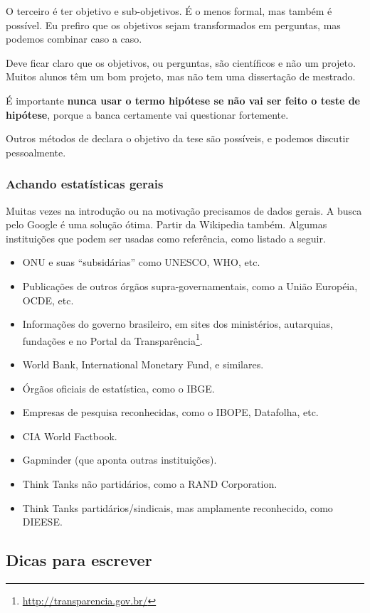 \documentclass{article}
\begin{document}
O terceiro é ter objetivo e sub-objetivos. É o menos formal, mas também é possível. Eu prefiro que os objetivos sejam transformados em perguntas, mas podemos combinar caso a caso.

Deve ficar claro que os objetivos, ou perguntas, são científicos e não um projeto. Muitos alunos têm um bom projeto, mas não tem uma dissertação de mestrado.

É importante \textbf{nunca usar o termo hipótese se não vai ser feito o teste de hipótese}, porque a banca certamente vai questionar fortemente.

Outros métodos de declara o objetivo da tese são possíveis, e podemos discutir pessoalmente.

\subsubsection{Achando estatísticas gerais}

Muitas vezes na introdução ou na motivação precisamos de dados gerais. A busca pelo Google é uma solução ótima. Partir da Wikipedia também. Algumas instituições que podem ser usadas como referência, como listado a seguir.

\begin{itemize}
    \item ONU e suas ``subsidárias'' como UNESCO, WHO, etc.
    \item Publicações de outros órgãos supra-governamentais, como a União Européia, OCDE, etc.
    \item Informações do governo brasileiro, em sites dos ministérios, autarquias, fundações e no Portal da Transparência\footnote{\url{http://transparencia.gov.br/}}.
    \item World Bank, International Monetary Fund, e similares.
    \item Órgãos oficiais de estatística, como o IBGE.
    \item Empresas de pesquisa reconhecidas, como o IBOPE, Datafolha, etc.
    \item CIA World Factbook.
    \item Gapminder (que aponta outras instituições).
    \item Think Tanks não partidários, como a RAND Corporation.
    \item Think Tanks partidários/sindicais, mas amplamente reconhecido, como DIEESE.
\end{itemize}

\subsection{Dicas para escrever}
    
\end{document}
